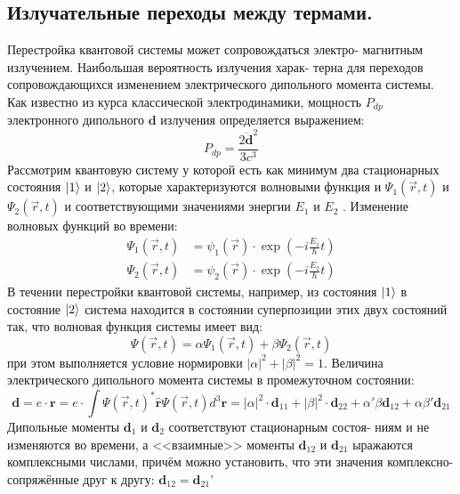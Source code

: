 \documentclass[a4paper, 12pt]{article}
\begin{document}
\subsection{Излучательные переходы между термами.}
Перестройка квантовой системы может сопровождаться электро-
магнитным излучением. Наибольшая вероятность излучения харак-
терна для переходов сопровождающихся изменением электрического
дипольного момента системы. Как известно из курса классической
электродинамики, мощность $P_{dp}$ электронного дипольного $\textbf{d}$ излучения определяется выражением:
\begin{equation}
	P_{dp}=\frac{2\ddot{\textbf{d}}^2}{3c^3}
\end{equation}
Рассмотрим квантовую систему у которой есть как минимум два
стационарных состояния $\ket{1}$ и $\ket{2}$, которые характеризуются волновыми функция и $\Psi_{1}(\vec{r},{t})$ и  $\Psi_{2}(\vec{r},{t})$ и соответствующими значениями энергии $E_1$ и $E_2$ . Изменение волновых функций во времени:
\begin{equation}
\begin{aligned}
	\Psi_{1}(\vec{r},{t})&=\psi_{1}(\vec{r})\cdot\exp\left(-i\frac{E_1}{\hbar}t\right)\\
	\Psi_{2}(\vec{r},{t})&=\psi_{2}(\vec{r})\cdot\exp\left(-i\frac{E_2}{\hbar}t\right)
\end{aligned}
\end{equation}
В течении перестройки квантовой системы, например, из состояния $\ket{1}$ в состояние $\ket{2}$ система находится в состоянии суперпозиции этих
двух состояний так, что волновая функция системы имеет вид:
\begin{equation}
	\Psi(\vec{r},{t})=\alpha\Psi_{1}(\vec{r},{t})+\beta\Psi_{2}(\vec{r},{t})
\end{equation}
при этом выполняется условие нормировки $|\alpha|^2+|\beta|^2=1$. Величина
электрического дипольного момента системы в промежуточном состоянии:
\begin{equation}
\textbf{d}={e}\cdot\textbf{r}={e}\cdot\int\Psi(\vec{{r}},{t})^{*}\hat{\textbf{r}}\Psi(\vec{{r}},{t})d^3\textbf{r}=|\alpha|^2\cdot\textbf{d}_{11}+|\beta|^2\cdot\textbf{d}_{22}+\alpha'\beta\textbf{d}_{12} +\alpha\beta'\textbf{d}_{21}
\end{equation}
Дипольные моменты $\textbf{d}_{1}$ и $\textbf{d}_{2}$ соответствуют стационарным состоя-
ниям и не изменяются во времени, а <<взаимные>> моменты $\textbf{d}_{12}$ и $\textbf{d}_{21}$ ыражаются комплексными числами, причём можно
установить, что эти значения комплексно-сопряжённые друг к другу: $\textbf{d}_{12} = \textbf{d}_{21}’$
\end{document}
